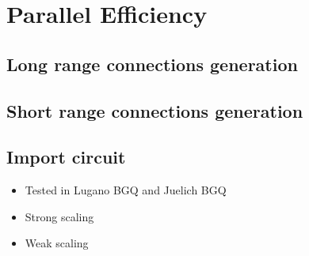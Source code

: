 \newpage
\section{Parallel Efficiency}

\subsection{Long range connections generation}
\subsection{Short range connections generation}
\subsection{Import circuit}

\begin{itemize}
      \item Tested in Lugano BGQ and Juelich BGQ
      \item Strong scaling
      \item Weak scaling
\end{itemize}

